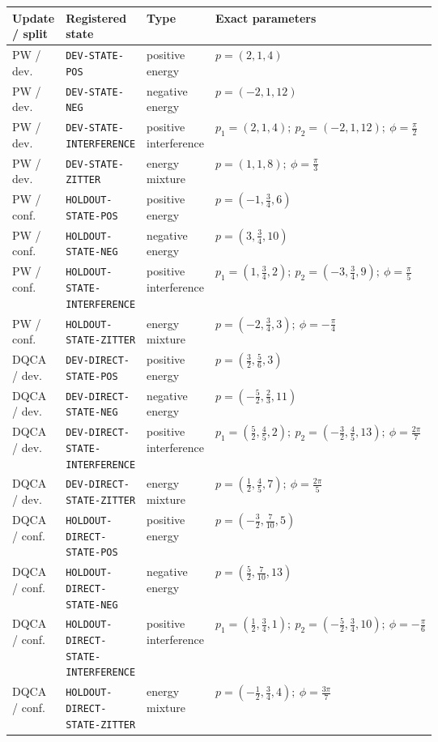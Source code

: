 \begin{tabularx}{\linewidth}{@{}p{0.10\linewidth}p{0.32\linewidth}p{0.19\linewidth}X@{}}
\toprule
Update / split & Registered state & Type & Exact parameters \\
\midrule
PW / dev. & \texttt{DEV-\allowbreak{}STATE-\allowbreak{}POS} & positive energy & $p=(2,1,4)$ \\
PW / dev. & \texttt{DEV-\allowbreak{}STATE-\allowbreak{}NEG} & negative energy & $p=(-2,1,12)$ \\
PW / dev. & \texttt{DEV-\allowbreak{}STATE-\allowbreak{}INTERFERENCE} & positive interference & $p_1=(2,1,4);\ p_2=(-2,1,12);\ \phi=\tfrac{\pi}{2}$ \\
PW / dev. & \texttt{DEV-\allowbreak{}STATE-\allowbreak{}ZITTER} & energy mixture & $p=(1,1,8);\ \phi=\tfrac{\pi}{3}$ \\
PW / conf. & \texttt{HOLDOUT-\allowbreak{}STATE-\allowbreak{}POS} & positive energy & $p=(-1,\tfrac{3}{4},6)$ \\
PW / conf. & \texttt{HOLDOUT-\allowbreak{}STATE-\allowbreak{}NEG} & negative energy & $p=(3,\tfrac{3}{4},10)$ \\
PW / conf. & \texttt{HOLDOUT-\allowbreak{}STATE-\allowbreak{}INTERFERENCE} & positive interference & $p_1=(1,\tfrac{3}{4},2);\ p_2=(-3,\tfrac{3}{4},9);\ \phi=\tfrac{\pi}{5}$ \\
PW / conf. & \texttt{HOLDOUT-\allowbreak{}STATE-\allowbreak{}ZITTER} & energy mixture & $p=(-2,\tfrac{3}{4},3);\ \phi=-\tfrac{\pi}{4}$ \\
DQCA / dev. & \texttt{DEV-\allowbreak{}DIRECT-\allowbreak{}STATE-\allowbreak{}POS} & positive energy & $p=(\tfrac{3}{2},\tfrac{5}{6},3)$ \\
DQCA / dev. & \texttt{DEV-\allowbreak{}DIRECT-\allowbreak{}STATE-\allowbreak{}NEG} & negative energy & $p=(-\tfrac{5}{2},\tfrac{2}{3},11)$ \\
DQCA / dev. & \texttt{DEV-\allowbreak{}DIRECT-\allowbreak{}STATE-\allowbreak{}INTERFERENCE} & positive interference & $p_1=(\tfrac{5}{2},\tfrac{4}{5},2);\ p_2=(-\tfrac{3}{2},\tfrac{4}{5},13);\ \phi=\tfrac{2\pi}{7}$ \\
DQCA / dev. & \texttt{DEV-\allowbreak{}DIRECT-\allowbreak{}STATE-\allowbreak{}ZITTER} & energy mixture & $p=(\tfrac{1}{2},\tfrac{4}{5},7);\ \phi=\tfrac{2\pi}{5}$ \\
DQCA / conf. & \texttt{HOLDOUT-\allowbreak{}DIRECT-\allowbreak{}STATE-\allowbreak{}POS} & positive energy & $p=(-\tfrac{3}{2},\tfrac{7}{10},5)$ \\
DQCA / conf. & \texttt{HOLDOUT-\allowbreak{}DIRECT-\allowbreak{}STATE-\allowbreak{}NEG} & negative energy & $p=(\tfrac{5}{2},\tfrac{7}{10},13)$ \\
DQCA / conf. & \texttt{HOLDOUT-\allowbreak{}DIRECT-\allowbreak{}STATE-\allowbreak{}INTERFERENCE} & positive interference & $p_1=(\tfrac{1}{2},\tfrac{3}{4},1);\ p_2=(-\tfrac{5}{2},\tfrac{3}{4},10);\ \phi=-\tfrac{\pi}{6}$ \\
DQCA / conf. & \texttt{HOLDOUT-\allowbreak{}DIRECT-\allowbreak{}STATE-\allowbreak{}ZITTER} & energy mixture & $p=(-\tfrac{1}{2},\tfrac{3}{4},4);\ \phi=\tfrac{3\pi}{7}$ \\
\bottomrule
\end{tabularx}
